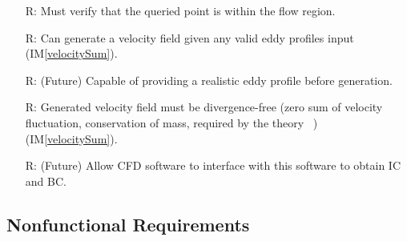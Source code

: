 \documentclass[12pt]{article}
\newcommand{\iref}[1]{IM\ref{#1}}
\newcounter{reqnum} %
\begin{document}
\noindent \begin{itemize}

\item[R\refstepcounter{reqnum}\thereqnum \label{R_inputs}:] Must verify that the queried point is within the flow region.


\item[R\refstepcounter{reqnum}\thereqnum \label{R_anyEddy}:] Can generate a velocity field given any valid eddy profiles input (\iref{velocitySum}).
\item[R\refstepcounter{reqnum}\thereqnum \label{R_realEddy}:] (Future) Capable of providing a realistic eddy profile before generation.

\item[R\refstepcounter{reqnum}\thereqnum \label{R_zeroSum}:] Generated velocity field must be divergence-free (zero sum of velocity fluctuation, conservation of mass, required by the theory ~\citet{PolettoEtAl2013}) (\iref{velocitySum}).

\item[R\refstepcounter{reqnum}\thereqnum \label{R_CFD}:] (Future) Allow CFD software to interface with this software to obtain IC and BC.


\end{itemize}


\subsection{Nonfunctional Requirements}
\end{document}
